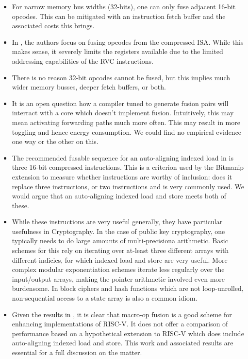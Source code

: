 \begin{itemize}
\item For narrow memory bus widths (32-bits), one can only
    fuse adjacent 16-bit opcodes. This can be mitigated with an
    instruction fetch buffer and the associated costs this brings.

\item In \cite{CDPA:16}, the authors focus on fusing opcodes from the
    compressed ISA. While this makes sense, it severely limits the
    registers available due to the limited addressing capabilities of
    the RVC instructions.

\item There is no reason 32-bit opcodes cannot be fused, but this
    implies much wider memory busses, deeper fetch buffers, or both.

\item It is an open question how a compiler tuned to generate
    fusion pairs will interract with a core which doesn't implement
    fusion. Intuitively, this may mean activating forwarding paths
    much more often. This may result in more toggling and hence
    energy consumption. We could find no empirical evidence one way
    or the other on this.

\item The recommended fusable sequence for an auto-aligning indexed load in
    \cite[Section VI.A]{CDPA:16} is three 16-bit compressed instructions.
    This is a criterion used by the Bitmanip extension to measure whether
    instructions are worthy of inclusion: does it replace three
    instructions, or two instructions and is very commonly used.
    We would argue that an auto-aligning indexed load and store
    meets both of these.

\item While these instructions are very useful generally, they have
    particular usefulness in Cryptography.
    In the case of public key cryptography, one typically needs to do
    large amounts of multi-precisiona arithmetic.
    Basic schemes for this rely on iterating over at-least three
    different arrays with different indicies, for which indexed load
    and store are very useful.
    More complex modular exponentiation schemes iterate less regularly
    over the input/output arrays, making the pointer arithmetic involved
    even more burdensome.
    In block ciphers and hash functions which are not loop-unrolled,
    non-sequential access to a state array is also a common idiom.

\item Given the results in \cite{CDPA:16}, it is clear that
    macro-op fusion is a good scheme for enhancing implementations of
    RISC-V.
    It does not offer a comparison of performance based on a
    hypothetical extension to RISC-V which does include
    auto-aligning indexed load and store.
    This work and associated results are essential for a full discussion on
    the matter.
\end{itemize}

